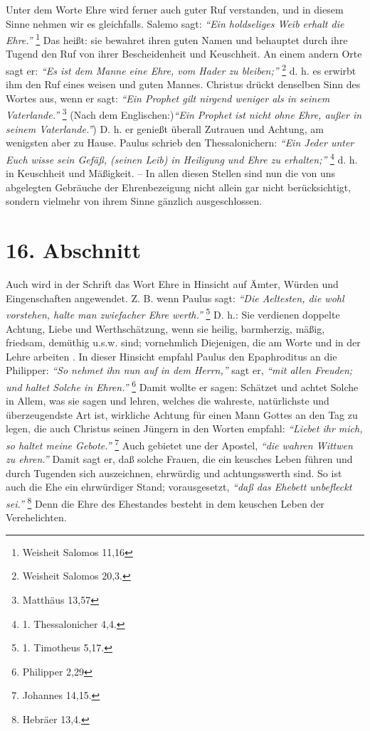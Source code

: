 Unter dem Worte Ehre wird ferner auch guter Ruf verstanden, und in diesem Sinne
nehmen wir es gleichfalls. Salemo sagt:
\textit{"`Ein holdseliges Weib erhalt die Ehre."'}
\footnote{Weisheit Salomos 11,16}
Das heißt: sie bewahret ihren guten Namen und
behauptet durch ihre Tugend den Ruf von ihrer Bescheidenheit und Keuschheit. An
einem andern Orte sagt er:
\textit{"`Es ist dem Manne eine Ehre, vom Hader zu bleiben;"'}
\footnote{Weisheit Salomos 20,3.}
d. h. es erwirbt ihm den Ruf eines weisen und
guten Mannes. Christus drückt denselben Sinn des Wortes aus, wenn er sagt:
\textit{"`Ein Prophet gilt nirgend weniger als in seinem Vaterlande."'}
\footnote{Matthäus 13,57}
(Nach dem Englischen:)\textit{"`Ein Prophet ist nicht ohne Ehre, außer in seinem
Vaterlande."'}) D. h. er genießt überall Zutrauen und Achtung, am wenigsten aber
zu
Hause. Paulus schrieb den Thessalonichern:
\textit{"`Ein Jeder unter Euch wisse sein
Gefäß, (seinen Leib) in Heiligung und Ehre zu erhalten;"'}
\footnote{1. Thessalonicher 4,4.}
d. h. in Keuschheit und Mäßigkeit. -- In allen diesen Stellen sind nun die
von uns abgelegten Gebräuche der Ehrenbezeigung nicht allein gar nicht
berücksichtigt, sondern vielmehr von ihrem Sinne gänzlich ausgeschlossen.

\section{16. Abschnitt} \label{kap9_ab16}

Auch wird in der Schrift das Wort Ehre in Hinsicht auf Ämter, Würden und
Eingenschaften angewendet. Z. B. wenn Paulus sagt:
\textit{"`Die Aeltesten, die wohl
vorstehen, halte man zwiefacher Ehre werth."'}
\footnote{1. Timotheus 5,17.}
D. h.: Sie
verdienen doppelte Achtung, Liebe und Werthschätzung, wenn sie heilig,
barmherzig, mäßig, friedsam, demüthig u.s.w. sind; vornehmlich Diejenigen, die
am Worte und in der Lehre arbeiten . In dieser
Hinsicht empfahl Paulus den
Epaphroditus an die Philipper:
\textit{"`So nehmet ihn nun auf in dem Herrn,"'} sagt er,
\textit{"`mit allen Freuden; und haltet Solche in Ehren."'}
\footnote{Philipper 2,29}
Damit
wollte er sagen: Schätzet und achtet Solche in Allem, was sie sagen und lehren,
welches die wahreste, natürlichste und überzeugendste Art ist, wirkliche Achtung
für einen Mann Gottes an den Tag zu legen, die auch Christus seinen Jüngern in
den Worten empfahl:
\textit{"`Liebet ihr mich, so haltet meine Gebote."'}
\footnote{Johannes 14,15.}
Auch gebietet une der Apostel,
\textit{"`die wahren Wittwen zu ehren."'} Damit
sagt er, daß solche Frauen, die ein keusches Leben führen und durch Tugenden
sich auszeichnen, ehrwürdig und achtungsswerth sind. So ist auch die Ehe ein
ehrwürdiger Stand; vorausgesetzt,
\textit{"`daß das Ehebett unbefleckt sei."'}
\footnote{Hebräer 13,4.}
Denn die Ehre des Ehestandes besteht in dem keuschen
Leben der Verehelichten.

